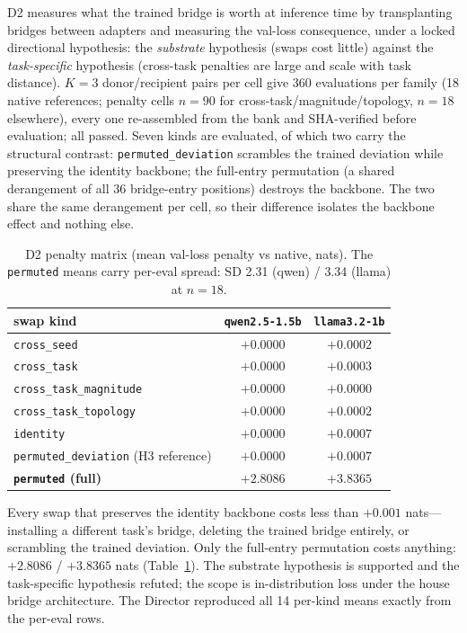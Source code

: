 \documentclass[10pt]{article}
\begin{document}
D2 measures what the trained bridge is worth at inference time by
transplanting bridges between adapters and measuring the val-loss
consequence, under a locked directional hypothesis: the \emph{substrate}
hypothesis (swaps cost little) against the \emph{task-specific} hypothesis
(cross-task penalties are large and scale with task distance). $K = 3$
donor/recipient pairs per cell give 360 evaluations per family (18 native
references; penalty cells $n = 90$ for cross-task/magnitude/topology,
$n = 18$ elsewhere), every one re-assembled from the bank and SHA-verified
before evaluation; all passed. Seven kinds are evaluated, of which two
carry the structural contrast: \texttt{permuted\_deviation} scrambles the
trained deviation while preserving the identity backbone; the full-entry
permutation (a shared derangement of all 36 bridge-entry positions)
destroys the backbone. The two share the same derangement per cell, so
their difference isolates the backbone effect and nothing else.

\begin{table}[ht]
\centering
\caption{D2 penalty matrix (mean val-loss penalty vs native, nats). The
\texttt{permuted} means carry per-eval spread: SD 2.31 (qwen) / 3.34
(llama) at $n = 18$.}
\label{tab:d2}
\begin{tabular}{lcc}
\toprule
swap kind & \texttt{qwen2.5-1.5b} & \texttt{llama3.2-1b} \\
\midrule
\texttt{cross\_seed} & $+0.0000$ & $+0.0002$ \\
\texttt{cross\_task} & $+0.0000$ & $+0.0003$ \\
\texttt{cross\_task\_magnitude} & $+0.0000$ & $+0.0000$ \\
\texttt{cross\_task\_topology} & $+0.0000$ & $+0.0002$ \\
\texttt{identity} & $+0.0000$ & $+0.0007$ \\
\texttt{permuted\_deviation} (H3 reference) & $+0.0000$ & $+0.0007$ \\
\textbf{\texttt{permuted} (full)} & $\mathbf{+2.8086}$ & $\mathbf{+3.8365}$ \\
\bottomrule
\end{tabular}
\end{table}

Every swap that preserves the identity backbone costs less than $+0.001$
nats---installing a different task's bridge, deleting the trained bridge
entirely, or scrambling the trained deviation. Only the full-entry
permutation costs anything: $+2.8086$ / $+3.8365$ nats
(Table~\ref{tab:d2}). The substrate hypothesis is supported and the
task-specific hypothesis refuted; the scope is in-distribution loss under
the house bridge architecture. The Director reproduced all 14 per-kind
means exactly from the per-eval rows.
\end{document}

